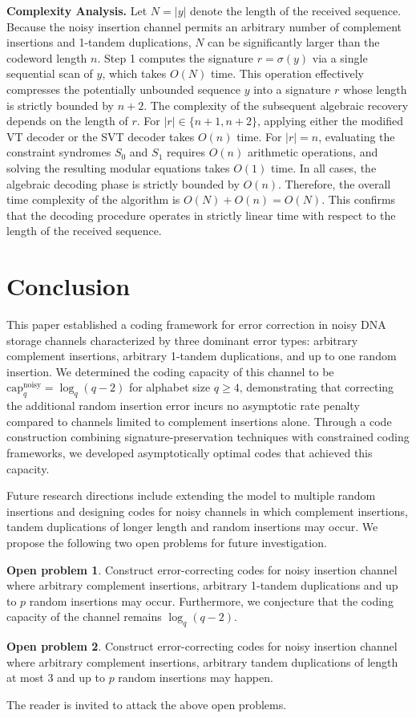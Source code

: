 \documentclass[pdflatex,sn-mathphys-num]{sn-jnl}
\theoremstyle{theorem}%
\theoremstyle{definition}
\theoremstyle{construction}
\newtheorem{open problem}{Open problem}
\begin{document}
\textbf{Complexity Analysis.} Let $N = |y|$ denote the length of the received sequence. Because the noisy insertion channel permits an arbitrary number of complement insertions and 1-tandem duplications, $N$ can be significantly larger than the codeword length $n$. Step 1 computes the signature $r = \sigma(y)$ via a single sequential scan of $y$, which takes $O(N)$ time. This operation effectively compresses the potentially unbounded sequence $y$ into a signature $r$ whose length is strictly bounded by $n+2$. The complexity of the subsequent algebraic recovery depends on the length of $r$. For $|r| \in \{n+1, n+2\}$, applying either the modified VT decoder or the SVT decoder takes $O(n)$ time. For $|r| = n$, evaluating the constraint syndromes $S_0$ and $S_1$ requires $O(n)$ arithmetic operations, and solving the resulting modular equations takes $O(1)$ time. In all cases, the algebraic decoding phase is strictly bounded by $O(n)$. Therefore, the overall time complexity of the algorithm is $O(N) + O(n) = O(N)$. This confirms that the decoding procedure operates in strictly linear time with respect to the length of the received sequence.

 


\section{Conclusion}\label{conclusion}
This paper established a coding framework for error correction in noisy DNA storage channels characterized by three dominant error types: arbitrary complement insertions, arbitrary 1-tandem duplications, and up to one random insertion. We determined the coding capacity of this channel to be $\mathrm{cap}_q^{\mathrm{noisy}} = \log_q(q-2)$ for alphabet size $q \geq 4$, demonstrating that correcting the additional random insertion error incurs no asymptotic rate penalty compared to channels limited to complement insertions alone. Through a code construction combining signature-preservation techniques with constrained coding frameworks, we developed asymptotically optimal codes that achieved this capacity.\par 
Future research directions include extending the model to multiple random insertions and designing codes for noisy channels in which complement insertions, tandem duplications of longer length and random insertions may occur. We propose the following two open problems for future investigation.
\begin{open problem}
Construct error-correcting codes for noisy insertion channel where arbitrary complement insertions, arbitrary 1-tandem duplications and up to $p$ random insertions may occur. Furthermore, we conjecture that the coding capacity of the channel remains $\log_{q}(q-2)$.
\end{open problem}
\begin{open problem}
Construct error-correcting codes for noisy insertion channel where arbitrary complement insertions, arbitrary tandem duplications of length at most 3 and up to $p$ random insertions may happen. 
\end{open problem}
The reader is invited to attack the above open problems.
\end{document}
